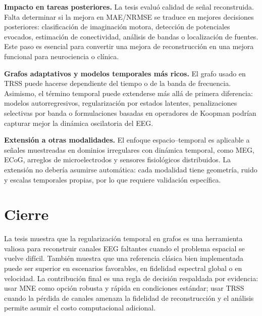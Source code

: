 \textbf{Impacto en tareas posteriores.} La tesis evaluó calidad de señal reconstruida. Falta determinar si la mejora en MAE/NRMSE se traduce en mejores decisiones posteriores: clasificación de imaginación motora, detección de potenciales evocados, estimación de conectividad, análisis de bandas o localización de fuentes. Este paso es esencial para convertir una mejora de reconstrucción en una mejora funcional para neurociencia o clínica.

\textbf{Grafos adaptativos y modelos temporales más ricos.} El grafo usado en TRSS puede hacerse dependiente del tiempo o de la banda de frecuencia. Asimismo, el término temporal puede extenderse más allá de primera diferencia: modelos autorregresivos, regularización por estados latentes, penalizaciones selectivas por banda o formulaciones basadas en operadores de Koopman podrían capturar mejor la dinámica oscilatoria del EEG.

\textbf{Extensión a otras modalidades.} El enfoque espacio--temporal es aplicable a señales muestreadas en dominios irregulares con dinámica temporal, como MEG, ECoG, arreglos de microelectrodos y sensores fisiológicos distribuidos. La extensión no debería asumirse automática: cada modalidad tiene geometría, ruido y escalas temporales propias, por lo que requiere validación específica.

\section{Cierre}

La tesis muestra que la regularización temporal en grafos es una herramienta valiosa para reconstruir canales EEG faltantes cuando el problema espacial se vuelve difícil. También muestra que una referencia clásica bien implementada puede ser superior en escenarios favorables, en fidelidad espectral global o en velocidad. La contribución final es una regla de decisión respaldada por evidencia: usar MNE como opción robusta y rápida en condiciones estándar; usar TRSS cuando la pérdida de canales amenaza la fidelidad de reconstrucción y el análisis permite asumir el costo computacional adicional.
